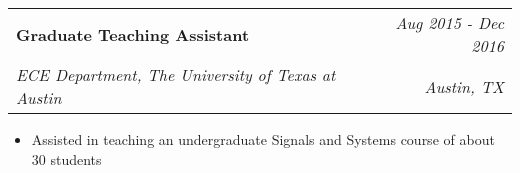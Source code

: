 \documentclass[letterpaper,11pt]{article}
\makeatletter
\newcommand{\JobSubheading}[4]{
  \vspace{-1pt}
    \begin{tabular*}{\textwidth}[t]{l@{\extracolsep{\fill}}r}
      \textbf {#1} & \textit{#2}  \\
      \textit{#3} & \textit{#4} \\
    \end{tabular*}\vspace{-5pt}
}
\makeatother
\begin{document}
    \JobSubheading
       {Graduate Teaching Assistant}{Aug 2015 - Dec 2016}
      {ECE Department, The University of Texas at Austin}{Austin, TX}
      \vspace{-1pt}
      \begin{itemize}
        \item Assisted in teaching an undergraduate Signals and Systems course of about 30 students
    \end{itemize}
    \vspace{-2pt}
 
    \begin{comment}

    \JobSubheading
      {Graduate Research Assistant}{Aug 2015 - Dec 2016}
      {ECE Department, The University of Texas at Austin}{Austin, TX}
      \vspace{-1pt}
      \begin{itemize}
        \item Researched full-duplex radio as part of a 4 person pre-startup team. Ported MATLAB to C
      \end{itemize}
    \vspace{-2pt}
    
    \JobSubheading
      {Pharos Lab, The University of Texas at Austin}{Austin, TX}
      {Lab Assistant}{Jan 2014 - May 2014}
      \vspace{0pt}
      \begin{itemize}
        \item Helped setup robots in Linux and ROS
      \end{itemize}
    
    \JobSubheading
      {Sanger Learning Center, The University of Texas at Austin}{Austin, TX}
      {Undergraduate Tutor}{Sep 2013 - Sep 2014}
      \vspace{0pt}
      \begin{itemize}
        \item Tutored peers in Calculus and French
      \end{itemize}
      
    \end{comment}
      

\end{document}

